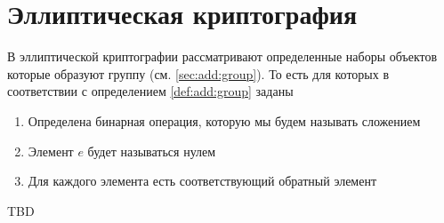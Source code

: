 \section{Эллиптическая криптография}

В эллиптической криптографии рассматривают определенные наборы
объектов которые образуют группу (см. \autoref{sec:add:group}). То
есть для которых в соответствии с определением \ref{def:add:group}
заданы 
\begin{enumerate}
\item Определена бинарная операция, которую мы будем называть сложением
\item Элемент $e$ будет называться нулем
\item Для каждого элемента есть соответствующий обратный элемент
\end{enumerate}
TBD
